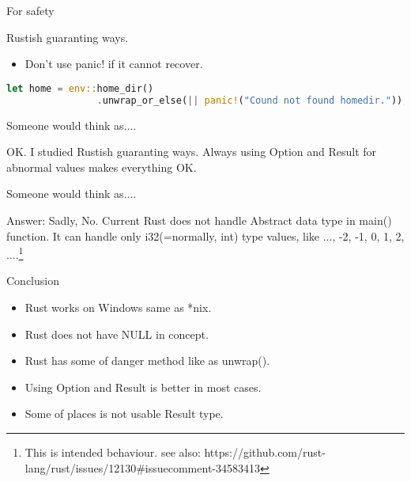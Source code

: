 \documentclass[12pt, unicode]{beamer}
\begin{document}
\begin{frame}[fragile]{For safety}
  \begin{block}{}
    Rustish guaranting ways.
  \end{block}
\begin{itemize}
\item<1-> Don't use panic! if it cannot recover.
\end{itemize}
  \begin{lstlisting}[language={Rust},basicstyle=\ttfamily\SSmall]
    let home = env::home_dir()
                .unwrap_or_else(|| panic!("Cound not found homedir."));
  \end{lstlisting}
\end{frame}

\begin{frame}[fragile]{Someone would think as....}
  \begin{block}{}
    OK. I studied Rustish guaranting ways.
    \newline
    Always using Option and Result for abnormal values makes everything OK.
  \end{block}
\end{frame}

\begin{frame}[fragile]{Someone would think as....}
  \begin{block}{}
    Answer: Sadly, No.
    \newline
    Current Rust does not handle Abstract data type in main() function.
    It can handle only i32(=normally, int) type values, like ..., -2, -1, 0, 1, 2, ....\footnote[frame]{This is intended behaviour. see also: https://github.com/rust-lang/rust/issues/12130\#issuecomment-34583413}
  \end{block}
\end{frame}

\begin{frame}{Conclusion}
  \begin{itemize}
  \item Rust works on Windows same as *nix.
  \item Rust does not have NULL in concept.
  \item Rust has some of danger method like as unwrap().
  \item Using Option and Result is better in most cases.
  \item Some of places is not usable Result type.
  \end{itemize}
\end{frame}


\end{document}
